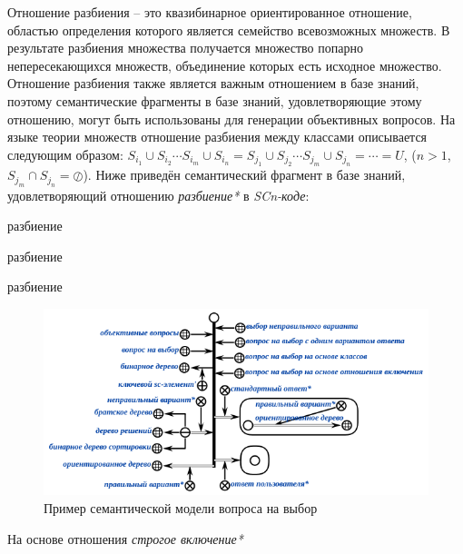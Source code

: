\begin{textitemize}
\begin{textitemize}
		Отношение разбиения – это квазибинарное ориентированное отношение, областью определения которого является семейство всевозможных множеств. В  результате разбиения множества получается множество попарно непересекающихся множеств, объединение которых есть исходное множество. Отношение разбиения также является важным отношением в базе знаний, поэтому семантические фрагменты в базе знаний, удовлетворяющие этому отношению, могут быть использованы для генерации объективных вопросов. На языке теории множеств отношение разбиения между классами описывается следующим образом: $S_{i_{1}}\cup  S_{i_{2}}\cdots S_{i_{m}} \cup S_{i_{n}} = S_{j_{1}}\cup  S_{j_{2}}\cdots S_{j_{m}} \cup S_{j_{n}}= \cdots = U$, ($n>1$, $S_{j_{m}} \cap S_{j_{n}} = \oslash$). Ниже приведён семантический фрагмент в базе знаний, удовлетворяющий отношению \textit{разбиение*} в \textit{SCn-коде}:
		\begin{SCn}
			\begin{scnrelfromset}{разбиение}
			\end{scnrelfromset}
			\begin{scnrelfromset}{разбиение}
			\end{scnrelfromset}
			\begin{scnrelfromset}{разбиение}
			\end{scnrelfromset}
		\end{SCn}
		\begin{figure}[H]
			\includegraphics[scale=1]{author/part7/figures/MC_question_example.png}
			\caption{Пример семантической модели вопроса на выбор}
			\label{fig:mc_example}
		\end{figure}
		
		\item На основе отношения \textit{строгое включение*}
		

\end{textitemize}
\end{textitemize}
